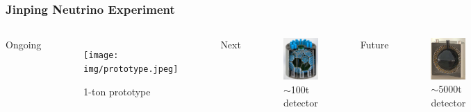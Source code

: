 \documentclass{beamer}
\begin{document}
\begin{frame}
\frametitle{Jinping Neutrino Experiment}
\setlength{\abovecaptionskip}{-2mm}
\vspace{-4mm}
\begin{columns}
\begin{center}
    Ongoing
\end{center}
\begin{figure}
    \centering
    \caption{1-ton prototype}
    \texttt{[image: img/prototype.jpeg]}
\end{figure}
\begin{center}
    Next
\end{center}
\begin{figure}
    \centering
    \caption{$\sim$100t detector}
    \includegraphics[width=0.6\linewidth]{img/100tondetector.png}
\end{figure}
\begin{center}
    Future
\end{center}
\begin{figure}
    \centering
    \caption{$\sim$5000t detector}
    \includegraphics[width=0.6\linewidth]{img/DetectoratJinping.jpg}
\end{figure}
\end{columns}
\end{frame}
\end{document}

